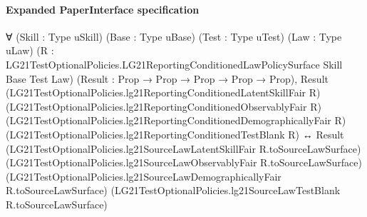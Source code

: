 \documentclass[10pt]{article}
\begin{document}
\paragraph{Expanded PaperInterface specification}
\begin{ReviewVerbatim}
∀ (Skill : Type uSkill) (Base : Type uBase) (Test : Type uTest) (Law : Type uLaw)
  (R : LG21TestOptionalPolicies.LG21ReportingConditionedLawPolicySurface Skill Base Test Law)
  (Result : Prop → Prop → Prop → Prop → Prop),
  Result (LG21TestOptionalPolicies.lg21ReportingConditionedLatentSkillFair R)
      (LG21TestOptionalPolicies.lg21ReportingConditionedObservablyFair R)
      (LG21TestOptionalPolicies.lg21ReportingConditionedDemographicallyFair R)
      (LG21TestOptionalPolicies.lg21ReportingConditionedTestBlank R) ↔
    Result (LG21TestOptionalPolicies.lg21SourceLawLatentSkillFair R.toSourceLawSurface)
      (LG21TestOptionalPolicies.lg21SourceLawObservablyFair R.toSourceLawSurface)
      (LG21TestOptionalPolicies.lg21SourceLawDemographicallyFair R.toSourceLawSurface)
      (LG21TestOptionalPolicies.lg21SourceLawTestBlank R.toSourceLawSurface)
\end{ReviewVerbatim}
\end{document}
